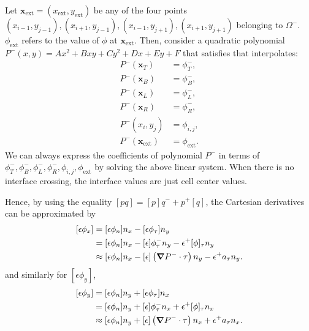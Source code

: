 Let $\mathbf{x}_{\text{ext}} = (x_{\text{ext}},y_{\text{ext}})$ be any of the four points $(x_{i-1}, y_{j-1}), (x_{i+1}, y_{j-1}), (x_{i-1}, y_{j+1}),(x_{i+1}, y_{j+1})$ belonging to $\Omega^-$. $\phi_{\text{ext}}$ refers to the value of $\phi$ at $\mathbf{x}_{\text{ext}}$. Then, consider a quadratic polynomial $P^-(x,y) = Ax^2 + Bxy + Cy^2 + Dx + Ey + F$ that satisfies that interpolates:
\begin{equation}
	\begin{aligned}
		P^-(\mathbf{x}_T)            & = \phi_T^-,          \\
		P^-(\mathbf{x}_B)            & = \phi_B^-,          \\
		P^-(\mathbf{x}_L)            & = \phi_L^-,          \\
		P^-(\mathbf{x}_R)            & = \phi_R^-,          \\
		P^-(x_i,y_j)                 & = \phi_{i,j},        \\
		P^-(\mathbf{x}_{\text{ext}}) & = \phi_{\text{ext}}.
	\end{aligned}
\end{equation}
We can always express the coefficients of polynomial $P^-$ in terms of $\phi_T^-, \phi_B^-, \phi_L^-, \phi_R^-, \phi_{i,j}, \phi_{\text{ext}}$ by solving the above linear system. When there is no interface crossing, the interface values are just cell center values.

Hence, by using the equality $[pq] = [p]q^- + p^+[q]$, the Cartesian derivatives can be approximated by
\begin{equation}
	\begin{aligned}
		[\epsilon \phi_x] & = [\epsilon \phi_n] n_x - [\epsilon \phi_\tau] n_y                                                     \\
		                  & = [\epsilon \phi_n] n_x - [\epsilon]\phi_\tau^- n_y - \epsilon^+ [\phi]_\tau n_y                       \\
		                  & \approx [\epsilon \phi_n] n_x - [\epsilon]\left(\grad{P^-}\cdot\tau\right)n_y - \epsilon^+ a_\tau n_y.
	\end{aligned}
	\label{eq:poisson_derivative_jump_x_geometry}
\end{equation}
and similarly for $[\epsilon \phi_y]$,
\begin{equation}
	\begin{aligned}
		[\epsilon \phi_y] & = [\epsilon \phi_n] n_y + [\epsilon \phi_\tau] n_x                                                     \\
		                  & = [\epsilon \phi_n] n_y + [\epsilon]\phi_\tau^- n_x + \epsilon^+ [\phi]_\tau n_x                       \\
		                  & \approx [\epsilon \phi_n] n_y + [\epsilon]\left(\grad{P^-}\cdot\tau\right)n_x + \epsilon^+ a_\tau n_x.
	\end{aligned}
\end{equation}

